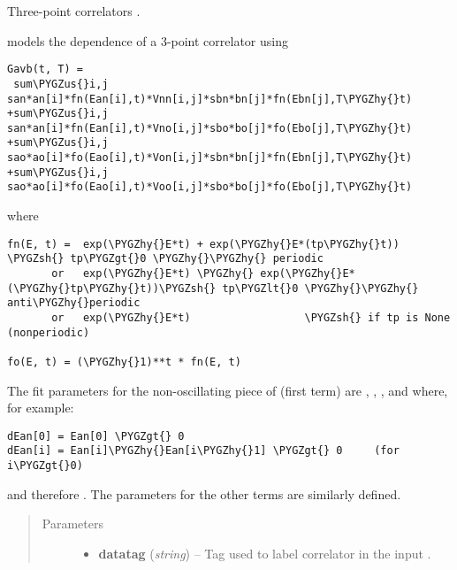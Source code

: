 \documentclass[letterpaper,10pt,english]{sphinxmanual}
\def\PYGZus{\char`\_}
\def\PYGZlt{\char`\<}
\def\PYGZgt{\char`\>}
\def\PYGZsh{\char`\#}
\def\PYGZhy{\char`\-}
\begin{document}
\begin{fulllineitems}
\label{corrfitter:corrfitter.Corr3}
Three-point correlators .

{\hyperref[corrfitter:corrfitter.Corr3]{}} models the  dependence of a 3-point correlator
 using

\begin{Verbatim}[commandchars=\\\{\}]
Gavb(t, T) = 
 sum\PYGZus{}i,j san*an[i]*fn(Ean[i],t)*Vnn[i,j]*sbn*bn[j]*fn(Ebn[j],T\PYGZhy{}t)
+sum\PYGZus{}i,j san*an[i]*fn(Ean[i],t)*Vno[i,j]*sbo*bo[j]*fo(Ebo[j],T\PYGZhy{}t)
+sum\PYGZus{}i,j sao*ao[i]*fo(Eao[i],t)*Von[i,j]*sbn*bn[j]*fn(Ebn[j],T\PYGZhy{}t)
+sum\PYGZus{}i,j sao*ao[i]*fo(Eao[i],t)*Voo[i,j]*sbo*bo[j]*fo(Ebo[j],T\PYGZhy{}t)
\end{Verbatim}

where

\begin{Verbatim}[commandchars=\\\{\}]
fn(E, t) =  exp(\PYGZhy{}E*t) + exp(\PYGZhy{}E*(tp\PYGZhy{}t)) \PYGZsh{} tp\PYGZgt{}0 \PYGZhy{}\PYGZhy{} periodic
       or   exp(\PYGZhy{}E*t) \PYGZhy{} exp(\PYGZhy{}E*(\PYGZhy{}tp\PYGZhy{}t))\PYGZsh{} tp\PYGZlt{}0 \PYGZhy{}\PYGZhy{} anti\PYGZhy{}periodic
       or   exp(\PYGZhy{}E*t)                  \PYGZsh{} if tp is None (nonperiodic)

fo(E, t) = (\PYGZhy{}1)**t * fn(E, t)
\end{Verbatim}

The fit parameters for the non-oscillating piece of  (first term)
are , , ,  and  where,
for example:

\begin{Verbatim}[commandchars=\\\{\}]
dEan[0] = Ean[0] \PYGZgt{} 0
dEan[i] = Ean[i]\PYGZhy{}Ean[i\PYGZhy{}1] \PYGZgt{} 0     (for i\PYGZgt{}0)
\end{Verbatim}

and therefore . The parameters for the
other terms are similarly defined.
\begin{quote}\begin{description}
\item[{Parameters}] \leavevmode\begin{itemize}
\item {} 
\textbf{datatag} (\emph{string}) -- Tag used to label correlator in the input .


\end{itemize}
\end{description}
\end{quote}
\end{fulllineitems}
\end{document}

